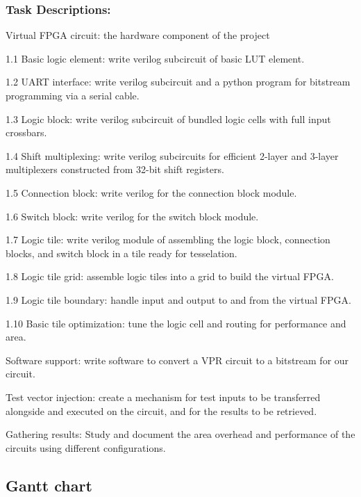 \subsubsection*{Task Descriptions:}
\begin{enumeration}
	\item Virtual FPGA circuit: the hardware component of the project \
	\begin{itemlist}
		\item[1.1] Basic logic element: write verilog subcircuit of basic LUT element.
		\item[1.2] UART interface: write verilog subcircuit and a python program for bitstream programming via a serial cable.
		\item[1.3] Logic block: write verilog subcircuit of bundled logic cells with full input crossbars.
		\item[1.4] Shift multiplexing: write verilog subcircuits for efficient 2-layer and 3-layer multiplexers constructed from 32-bit shift registers.
		\item[1.5] Connection block: write verilog for the connection block module.
		\item[1.6] Switch block: write verilog for the switch block module.
		\item[1.7] Logic tile: write verilog module of assembling the logic block, connection blocks, and switch block in a tile ready for tesselation.
		\item[1.8] Logic tile grid: assemble logic tiles into a grid to build the virtual FPGA.
		\item[1.9] Logic tile boundary: handle input and output to and from the virtual FPGA.
		\item[1.10] Basic tile optimization: tune the logic cell and routing for performance and area.
	\end{itemlist}
	\item Software support: write software to convert a VPR circuit to a bitstream for our circuit.
	\item Test vector injection: create a mechanism for test inputs to be transferred alongside and executed on the circuit, and for the results to be retrieved.
	\item Gathering results: Study and document the area overhead and performance of the circuits using different configurations.
\end{enumeration}


\subsection{Gantt chart} %

